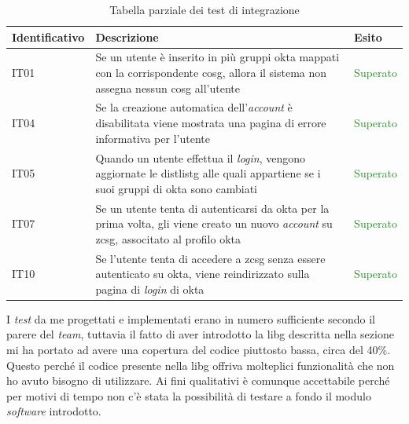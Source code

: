 \begin{center}
    \begin{table}[h]
    \def\arraystretch{1.65}
    \begin{tabular}{|p{3cm}|p{7cm}|p{2cm}|} %
        \hline
        \textbf{Identificativo} & \textbf{Descrizione} & \textbf{Esito} \\ \hline  
        IT01 & Se un utente è inserito in più gruppi \gls{okta} mappati con la corrispondente \gls{cosg}, allora il sistema non assegna nessun \gls{cosg} all'utente & \textcolor{ForestGreen}{Superato}\\ \hline
        IT04 & Se la creazione automatica dell'\textit{account} è disabilitata viene mostrata una pagina di errore informativa per l'utente & \textcolor{ForestGreen}{Superato}\\ \hline
        IT05 & Quando un utente effettua il \textit{login}, vengono aggiornate le \gls{distlistg} alle quali appartiene se i suoi gruppi di \gls{okta} sono cambiati & \textcolor{ForestGreen}{Superato}\\ \hline
        IT07 & Se un utente tenta di autenticarsi da \gls{okta} per la prima volta, gli viene creato un nuovo \textit{account} su \gls{zcsg}, associtato al profilo \gls{okta} & \textcolor{ForestGreen}{Superato}\\ \hline
        IT10 & Se l'utente tenta di accedere a \gls{zcsg} senza essere autenticato su \gls{okta}, viene reindirizzato sulla pagina di \textit{login} di \gls{okta} & \textcolor{ForestGreen}{Superato}\\ \hline
    \end{tabular}
    \caption{Tabella parziale dei test di integrazione}
    \end{table}
\end{center}

I \textit{test} da me progettati e implementati erano in numero sufficiente secondo il parere del \textit{team}, tuttavia il fatto di aver introdotto la \gls{libg} descritta nella sezione  mi ha portato ad avere una copertura del codice piuttosto bassa, circa del 40\%. Questo perché il codice presente nella \gls{libg} offriva molteplici funzionalità che non ho avuto bisogno di utilizzare. Ai fini qualitativi è comunque accettabile perché per motivi di tempo non c'è stata la possibilità di testare a fondo il modulo \textit{software} introdotto.

